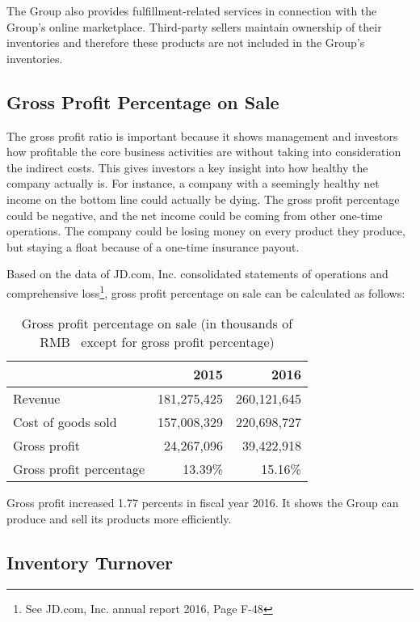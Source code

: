 The Group also provides fulfillment-related services in connection with the Group’s online marketplace. Third-party sellers maintain ownership of their
inventories and therefore these products are not included in the Group’s inventories.
\subsection{Gross Profit Percentage on Sale}

The gross profit ratio is important because it shows management and investors how profitable the core business activities are without taking into consideration the indirect costs. This gives investors a key insight into how healthy the company actually is. For instance, a company with a seemingly healthy net income on the bottom line could actually be dying. The gross profit percentage could be negative, and the net income could be coming from other one-time operations. The company could be losing money on every product they produce, but staying a float because of a one-time insurance payout.

Based on the data of JD.com, Inc. consolidated statements of operations and comprehensive loss\footnote{See JD.com, Inc. annual report 2016, Page F-48}, gross profit percentage on sale can be calculated as follows:

\begin{table}[H]	
	\begin{center}
		\begin{tabular}{lrr}
			\toprule
			&\textbf{2015}&\textbf{2016}\\
			\midrule
			Revenue&181,275,425&260,121,645\\
			Cost of goods sold&157,008,329&220,698,727\\
			Gross profit&24,267,096&39,422,918\\
			Gross profit percentage&13.39\%&15.16\%\\
			\bottomrule
		\end{tabular}
	\end{center}
	\caption{Gross profit percentage on sale (in thousands of RMB \textyen\ except for gross profit percentage)}\label{table:1}
\end{table}

Gross profit increased 1.77 percents in fiscal year 2016. It shows the Group can produce and sell its products more efficiently. 


\subsection{Inventory Turnover}

